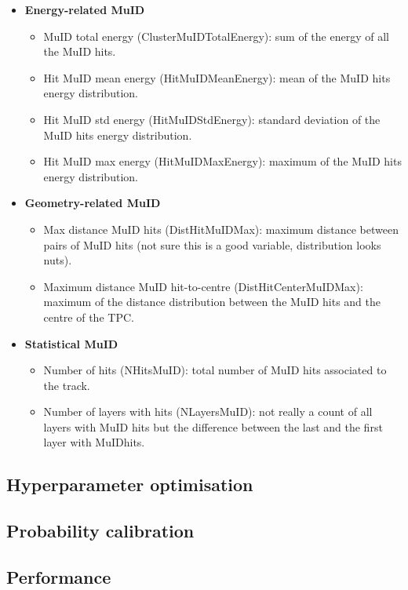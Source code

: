 \begin{itemize}
	\item \textbf{Energy-related MuID}
	\begin{itemize}
		\item MuID total energy (ClusterMuIDTotalEnergy): sum of the energy of all the MuID hits.
		\item Hit MuID mean energy (HitMuIDMeanEnergy): mean of the MuID hits energy distribution.
		\item Hit MuID std energy (HitMuIDStdEnergy): standard deviation of the MuID hits energy distribution.
		\item Hit MuID max energy (HitMuIDMaxEnergy): maximum of the MuID hits energy distribution.
	\end{itemize}
	\item \textbf{Geometry-related MuID}
	\begin{itemize}
		\item Max distance MuID hits (DistHitMuIDMax): maximum distance between pairs of MuID hits (not sure this is a good variable, distribution looks nuts).
		\item Maximum distance MuID hit-to-centre (DistHitCenterMuIDMax): maximum of the distance distribution between the MuID hits and the centre of the TPC.
	\end{itemize}
	\item \textbf{Statistical MuID}
	\begin{itemize}
		\item Number of hits (NHitsMuID): total number of MuID hits associated to the track.
		\item Number of layers with hits (NLayersMuID): not really a count of all layers with MuID hits but the difference between the last and the first layer with MuIDhits.
	\end{itemize}
\end{itemize}

\subsection{Hyperparameter optimisation}

\subsection{Probability calibration}

\subsection{Performance}

